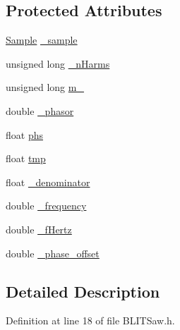 \subsection*{Protected Attributes}
\begin{DoxyCompactItemize}
\item 
\hyperlink{class_signal_1_1_sample}{Sample} \hyperlink{class_signal_1_1_b_l_i_t_1_1_b_l_i_t_ae3db6ee922897295fdf93a3b3c3dfadd}{\+\_\+sample}
\item 
unsigned long \hyperlink{class_signal_1_1_b_l_i_t_1_1_b_l_i_t_a0bfbf4e7515a42fab7df748b8497f648}{\+\_\+n\+Harms}
\item 
unsigned long \hyperlink{class_signal_1_1_b_l_i_t_1_1_b_l_i_t_a314aae37a0a53fa3f79a4466b9558fa5}{m\+\_\+}
\item 
double \hyperlink{class_signal_1_1_b_l_i_t_1_1_b_l_i_t_ae1ed1e1125cef25e6a0dfb8de3c296da}{\+\_\+phasor}
\item 
float \hyperlink{class_signal_1_1_b_l_i_t_1_1_b_l_i_t_afd06bf26696642f7eb400fb984e524f3}{phs}
\item 
float \hyperlink{class_signal_1_1_b_l_i_t_1_1_b_l_i_t_aa543d207e6dd260762652221c598bae9}{tmp}
\item 
float \hyperlink{class_signal_1_1_b_l_i_t_1_1_b_l_i_t_abef50d7ff7da92f5f0a8482287b47ae5}{\+\_\+denominator}
\item 
double \hyperlink{class_signal_1_1_signal_generator_a7f107461333bce68c5dad412db96a8c2}{\+\_\+frequency}
\item 
double \hyperlink{class_signal_1_1_signal_generator_a85a4702347352bab1c71e0a8df8437d6}{\+\_\+f\+Hertz}
\item 
double \hyperlink{class_signal_1_1_signal_generator_a6b4444d46747c8517171edbbf4b5588f}{\+\_\+phase\+\_\+offset}
\end{DoxyCompactItemize}


\subsection{Detailed Description}


Definition at line 18 of file B\+L\+I\+T\+Saw.\+h.



